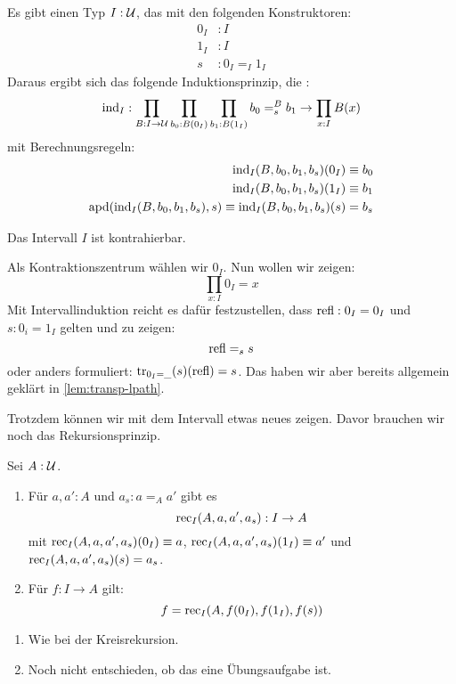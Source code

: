 \begin{regeln}
  Es gibt einen Typ $I:\mathcal{U}$, das  mit den folgenden Konstruktoren:
  \begin{align*}
    0_I&:I \\
    1_I&:I \\
    s&:0_I =_I 1_I
  \end{align*}
  Daraus ergibt sich das folgende Induktionsprinzip, die :
  \[
    \mathrm{ind}_{I}:\prod_{B:I\to\mathcal{U}}\prod_{b_0:B(0_I)}\prod_{b_1:B(1_I)}b_0 =_s^B b_1 \to\prod_{x:I}B(x) 
  \]
  mit Berechnungsregeln:
  \begin{align*}
    \mathrm{ind}_{I}(B,b_0,b_1,b_s)(0_I) &\equiv b_0 \\
    \mathrm{ind}_{I}(B,b_0,b_1,b_s)(1_I) &\equiv b_1 \\
    \mathrm{apd}(\mathrm{ind}_{I}(B,b_0,b_1,b_s),s)\equiv\mathrm{ind}_{I}(B,b_0,b_1,b_s)(s) &= b_s \\
  \end{align*}
\end{regeln}

\begin{bemerkung}
  Das Intervall $I$ ist kontrahierbar.
\end{bemerkung}
\begin{beweis}
  Als Kontraktionszentrum wählen wir $0_I$. Nun wollen wir zeigen:
  \[
    \prod_{x:I}0_I=x
  \]
  Mit Intervallinduktion reicht es dafür festzustellen, dass $\mathrm{refl}:0_I=0_I$ und $s:0_i=1_I$ gelten und zu zeigen:
  \[
    \mathrm{refl} =_s s
  \]
  oder anders formuliert: $\mathrm{tr}_{0_I=\_}(s)(\mathrm{refl})=s$. Das haben wir aber bereits allgemein geklärt in \cref{lem:transp-lpath}.
\end{beweis}

Trotzdem können wir mit dem Intervall etwas neues zeigen.
Davor brauchen wir noch das Rekursionsprinzip.
\begin{lemma}
  Sei $A:\mathcal{U}$.
  \begin{enumerate}
  \item Für $a,a':A$ und $a_s:a=_A a'$ gibt es
    \[
      \mathrm{rec}_{I}(A,a,a',a_s):I\to A
    \]
    mit $\mathrm{rec}_{I}(A,a,a',a_s)(0_I)\equiv a$, $\mathrm{rec}_{I}(A,a,a',a_s)(1_I)\equiv a'$ und $\mathrm{rec}_{I}(A,a,a',a_s)(s) = a_s$.
  \item Für $f:I\to A$ gilt:
    \[
      f=\mathrm{rec}_{I}(A,f(0_I),f(1_I),f(s))
    \]
  \end{enumerate}
\end{lemma}
\begin{beweis}
  \begin{enumerate}
  \item Wie bei der Kreisrekursion.
  \item Noch nicht entschieden, ob das eine Übungsaufgabe ist.
  \end{enumerate}
\end{beweis}

